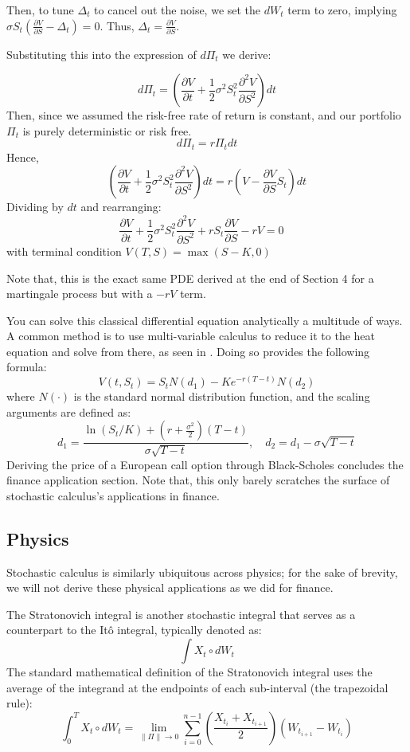 \documentclass[12pt]{article}
\theoremstyle{definition}
\theoremstyle{plain}
\theoremstyle{remark}
\begin{document}
Then, to tune $\Delta_t$ to cancel out the noise, we set the $dW_t$ term to zero, implying $\sigma S_t\left( \frac{\partial V}{\partial S} - \Delta_t \right) = 0$.  Thus, $\Delta_t = \frac{\partial V}{\partial S}$.

Substituting this into the expression of $d\Pi_t$ we derive:

\[
d\Pi_t = \left( \frac{\partial V}{\partial t} + \frac{1}{2} \sigma^2 S_t^2 \frac{\partial^2 V}{\partial S^2} \right) dt
\]
Then, since we assumed the risk-free rate of return is constant, and our portfolio $\Pi_t$ is purely deterministic or risk free.
\[
d\Pi_t = r\Pi_tdt
\]
Hence, 
\[
\left( \frac{\partial V}{\partial t} + \frac{1}{2} \sigma^2 S_t^2 \frac{\partial^2 V}{\partial S^2} \right) dt = r\left(V - \frac{\partial V}{\partial S}S_t \right)dt
\]
Dividing by $dt$ and rearranging:
\[
 \frac{\partial V}{\partial t} + \frac{1}{2} \sigma^2 S_t^2 \frac{\partial^2 V}{\partial S^2}  + rS_t \frac{\partial V}{\partial S}- rV  = 0 \quad
\]
with terminal condition $V(T,S) = \max(S-K,0)$

Note that, this is the exact same PDE derived at the end of Section 4 for a martingale process but with a $-rV$ term.

You can solve this classical differential equation analytically a multitude of ways.  A common method is to use multi-variable calculus to reduce it to the heat equation and solve from there, as seen in \cite{BlackscholesPDE}.  Doing so provides the following formula:
\[
V(t, S_t) = S_t N(d_1) - K e^{-r(T-t)} N(d_2)
\]
where $N(\cdot)$ is the standard normal distribution function, and the scaling arguments are defined as:
\[
d_1 = \frac{\ln(S_t / K) + \left(r + \frac{\sigma^2}{2}\right)(T-t)}{\sigma \sqrt{T-t}}, \quad d_2 = d_1 - \sigma \sqrt{T-t}
\]
Deriving the price of a European call option through Black-Scholes concludes the finance application section.  Note that, this only barely scratches the surface of stochastic calculus's applications in finance.

\subsection{Physics}

Stochastic calculus is similarly ubiquitous across physics; for the sake of brevity, we will not derive these physical applications as we did for finance.

The Stratonovich integral is another stochastic integral that serves as a counterpart to the It\^o integral, typically denoted as:
\[
\int X_t \circ dW_t
\]
The standard mathematical definition of the Stratonovich integral uses the average of the integrand at the endpoints of each sub-interval (the trapezoidal rule):
\[
\int_0^T X_t \circ dW_t = \lim_{\|\Pi\| \to 0} \sum_{i=0}^{n-1} \left( \frac{X_{t_i} + X_{t_{i+1}}}{2} \right) \left( W_{t_{i+1}} - W_{t_i} \right)
\]
\end{document}
